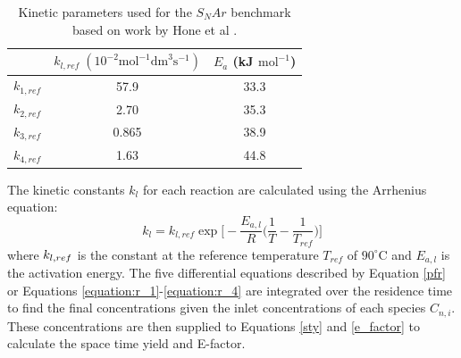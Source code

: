 \begin{table}[tb]
  \centering
  \caption{Kinetic parameters used for the $S_NAr$ benchmark based on work by Hone et al \cite{Hone2017}.}
  \begin{tabular}{ccc}
    &$k_{l,ref} \; (10^{-2} \text{mol}^{-1} \text{dm}^3 \text{s}^{-1})$ & $E_a$ (kJ $\text{mol}^{-1}$) \\
    \hline
    $k_{1,ref}$ & 57.9 & 33.3  \\
    $k_{2,ref}$ & 2.70 & 35.3  \\
    $k_{3,ref}$ & 0.865 & 38.9 \\
    $k_{4,ref}$ & 1.63 & 44.8 \\
  \end{tabular}
  
  \label{table:snar_parameters}
\end{table}

The kinetic constants $k_l$ for each reaction are calculated using the Arrhenius equation:
\begin{equation}
	k_l = k_{l, ref} \exp\Biggl[-\frac{E_{a,l}}{R}\biggl(\frac{1}{T}-\frac{1}{T_{ref}}\biggr)\Biggr]
\end{equation}
where $k_{l, \\ref}$ is the constant at the reference temperature $T_{ref}$ of $90^{\circ}$C and $E_{a,l}$ is the activation energy. The five differential equations described by Equation \ref{pfr} or Equations \ref{equation:r_1}-\ref{equation:r_4} are integrated over the residence time to find the final concentrations given the inlet concentrations of each species $C_{n,i}$. These concentrations are then supplied to Equations \ref{sty} and \ref{e_factor} to calculate the space time yield and E-factor.



